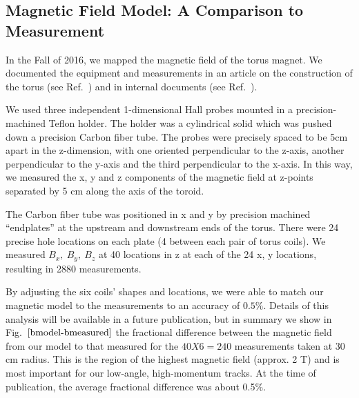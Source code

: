 \subsection{Magnetic Field Model: A Comparison to Measurement}
In the Fall of 2016, we mapped the magnetic field of the torus magnet.
We documented the equipment and measurements in an article on the
construction of the torus (see Ref.~\cite{torus-ieee}) and in internal
documents (see Ref.~\cite{magmapping}).

We used three independent 1-dimensional Hall probes mounted in a precision-machined
Teflon holder.  The holder was a cylindrical solid which was pushed down a precision
Carbon fiber tube.  The probes were precisely spaced to be 5cm apart in the z-dimension,
with one oriented perpendicular to the z-axis, another perpendicular to the y-axis and
the third perpendicular to the x-axis.  In this way, we measured the x, y and z components
of the magnetic field at z-points separated by 5 cm along the axis of the toroid.

The Carbon fiber tube was positioned in x and y by precision machined ``endplates'' at the
upstream and downstream ends of the torus.  There were 24 precise hole locations on each
plate  (4 between each pair of torus coils).  We measured $B_x, ~B_y, ~B_z$ at 40 
locations in z at each of the 24 x, y locations, resulting in 2880 measurements.

By adjusting the six coils' shapes and locations, we were able to match our
magnetic model to the measurements to an accuracy of $0.5\%$.  Details of this
analysis will be available in a future publication, but in summary we
show in Fig.~$\ref{bmodel-bmeasured}$ the fractional difference between
the magnetic field from our model to that measured for the $40 X 6 = 240$ measurements
taken at 30 cm radius.  This is the region of the highest magnetic field (approx. 2 T)
and is most important for our low-angle, high-momentum tracks.  At the time of publication,
the average fractional difference was about 0.5\%.

